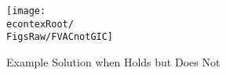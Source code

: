 \begin{figure}[tbp]
\centerline{\texttt{[image: \\econtexRoot/\\FigsRaw/FVACnotGIC]}}
\caption{Example Solution when \FVAC Holds but \GIC Does Not}
\label{fig:FVACnotGIC}
\end{figure}
